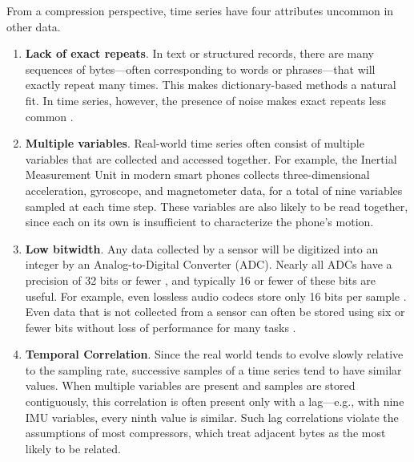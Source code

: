 
From a compression perspective, time series have four attributes uncommon in other data.

\begin{enumerate}
    \item \textbf{Lack of exact repeats}. In text or structured records, there are many sequences of bytes---often corresponding to words or phrases---that will exactly repeat many times. This makes dictionary-based methods a natural fit. In time series, however, the presence of noise makes exact repeats less common \cite{extract, epenthesis}.
    \item \textbf{Multiple variables}. Real-world time series often consist of multiple variables that are collected and accessed together. For example, the Inertial Measurement Unit in modern smart phones collects three-dimensional acceleration, gyroscope, and magnetometer data, for a total of nine variables sampled at each time step. These variables are also likely to be read together, since each on its own is insufficient to characterize the phone's motion. %
    \item \textbf{Low bitwidth}. Any data collected by a sensor will be digitized into an integer by an Analog-to-Digital Converter (ADC). Nearly all ADCs have a precision of 32 bits or fewer \cite{digikeyADCs}, and typically 16 or fewer of these bits are useful. For example, even lossless audio codecs store only 16 bits per sample \cite{flac, shorten}. Even data that is not collected from a sensor can often be stored using six or fewer bits without loss of performance for many tasks \cite{epenthesis, mdlIntrinsic, sax}.
    \item \textbf{Temporal Correlation}. Since the real world tends to evolve slowly relative to the sampling rate, successive samples of a time series tend to have similar values. When multiple variables are present and samples are stored contiguously, this correlation is often present only with a lag---e.g., with nine IMU variables, every ninth value is similar. Such lag correlations violate the assumptions of most compressors, which treat adjacent bytes as the most likely to be related.
\end{enumerate}

